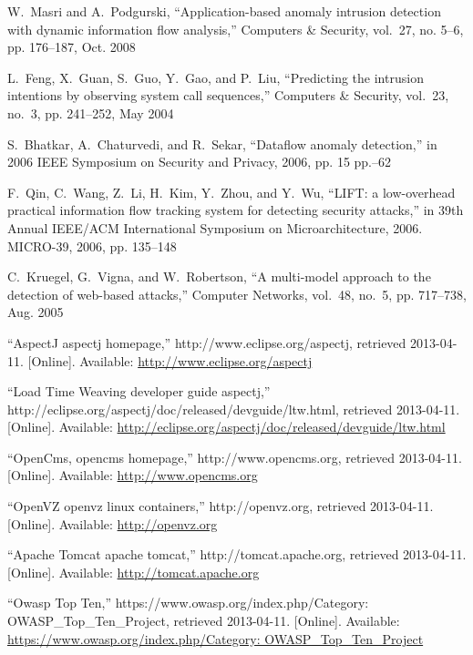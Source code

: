 \documentclass[conference]{IEEEtran}
\begin{document}
\begin{thebibliography}{10}
\BIBentryALTinterwordspacing
W.~Masri and A.~Podgurski, ``Application-based anomaly intrusion detection with
  dynamic information flow analysis,'' Computers \& Security, vol.~27,
  no. 5–6, pp. 176--187, Oct. 2008
\BIBentrySTDinterwordspacing

\BIBentryALTinterwordspacing
L.~Feng, X.~Guan, S.~Guo, Y.~Gao, and P.~Liu, ``Predicting the intrusion
  intentions by observing system call sequences,'' Computers \&
  Security, vol.~23, no.~3, pp. 241--252, May 2004
\BIBentrySTDinterwordspacing

S.~Bhatkar, A.~Chaturvedi, and R.~Sekar, ``Dataflow anomaly detection,'' in
  2006 {IEEE} Symposium on Security and Privacy, 2006, pp. 15 pp.--62

F.~Qin, C.~Wang, Z.~Li, H.~Kim, Y.~Zhou, and Y.~Wu, ``{LIFT:} a low-overhead
  practical information flow tracking system for detecting security attacks,''
  in 39th Annual {IEEE/ACM} International Symposium on Microarchitecture,
  2006. {MICRO-39}, 2006, pp. 135--148

\BIBentryALTinterwordspacing
C.~Kruegel, G.~Vigna, and W.~Robertson, ``A multi-model approach to the
  detection of web-based attacks,'' Computer Networks, vol.~48, no.~5,
  pp. 717--738, Aug. 2005
\BIBentrySTDinterwordspacing

\BIBentryALTinterwordspacing
``{AspectJ} aspectj homepage,'' {http://www.eclipse.org/aspectj}, retrieved
  2013-04-11. [Online]. Available: \url{http://www.eclipse.org/aspectj}
\BIBentrySTDinterwordspacing

\BIBentryALTinterwordspacing
``{Load Time Weaving} developer guide aspectj,''
  {http://eclipse.org/aspectj/doc/released/devguide/ltw.html}, retrieved
  2013-04-11. [Online]. Available:
  \url{http://eclipse.org/aspectj/doc/released/devguide/ltw.html}
\BIBentrySTDinterwordspacing

\BIBentryALTinterwordspacing
``{OpenCms}, opencms homepage,'' http://www.opencms.org, retrieved 2013-04-11.
  [Online]. Available: \url{http://www.opencms.org}
\BIBentrySTDinterwordspacing

\BIBentryALTinterwordspacing
``{OpenVZ} openvz linux containers,'' {http://openvz.org}, retrieved
  2013-04-11. [Online]. Available: \url{http://openvz.org}
\BIBentrySTDinterwordspacing

\BIBentryALTinterwordspacing
``{Apache Tomcat} apache tomcat,'' {http://tomcat.apache.org}, retrieved
  2013-04-11. [Online]. Available: \url{http://tomcat.apache.org}
\BIBentrySTDinterwordspacing

\BIBentryALTinterwordspacing
``{Owasp Top Ten},'' {https://www.owasp.org/index.php/Category:
  OWASP\_Top\_Ten\_Project}, retrieved 2013-04-11. [Online]. Available:
  \url{https://www.owasp.org/index.php/Category: OWASP\_Top\_Ten\_Project}
\BIBentrySTDinterwordspacing

\end{thebibliography}
\end{document}
